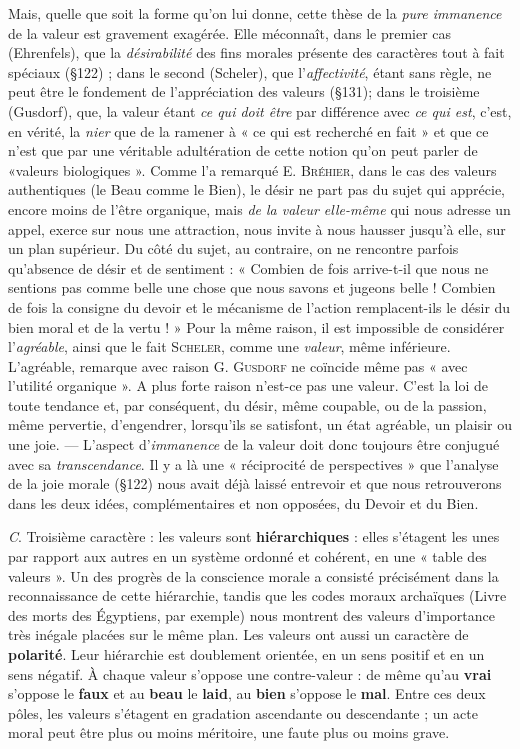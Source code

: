 Mais, quelle que soit la forme qu’on lui donne, cette thèse de la
{\it pure immanence} de la valeur est gravement exagérée. Elle méconnaît,
dans le premier cas (Ehrenfels), que la {\it désirabilité} des fins morales
présente des caractères tout à fait spéciaux (\S 122) ; dans le second
(Scheler), que l’{\it affectivité}, étant sans règle, ne peut être le fondement
de l'appréciation des valeurs (\S 131); dans le troisième (Gusdorf),
que, la valeur étant {\it ce qui doit être} par différence avec {\it ce qui est}, c’est,
en vérité, la {\it nier} que de la ramener à « ce qui est recherché en fait »
et que ce n’est que par une véritable adultération de cette notion
qu’on peut parler de «valeurs biologiques ». Comme l’a remarqué
E. \textsc{Bréhier}, dans le cas des valeurs authentiques (le Beau comme
le Bien), le désir ne part pas du sujet qui apprécie, encore moins
de l’être organique, mais {\it de la valeur elle-même} qui nous adresse
un appel, exerce sur nous une attraction, nous invite à nous hausser
jusqu’à elle, sur un plan supérieur. Du côté du sujet, au contraire,
on ne rencontre parfois qu’absence de désir et de sentiment : « Combien
de fois arrive-t-il que nous ne sentions pas comme belle une
chose que nous savons et jugeons belle ! Combien de fois la consigne du
devoir et le mécanisme de l’action remplacent-ils le désir du bien
moral et de la vertu ! » Pour la même raison, il est impossible de
considérer l’{\it agréable}, ainsi que le fait \textsc{Scheler}, comme une {\it valeur},
même inférieure. L’agréable, remarque avec raison G. \textsc{Gusdorf} ne
coïncide même pas « avec l'utilité organique ». A plus forte raison
n'est-ce pas une valeur. C’est la loi de toute tendance et, par conséquent,
du désir, même coupable, ou de la passion, même pervertie,
d’engendrer, lorsqu'ils se satisfont, un état agréable, un plaisir ou
une joie. — L'aspect d’{\it immanence} de la valeur doit donc toujours être
conjugué avec sa {\it transcendance}. Il y a là une « réciprocité de perspectives »
que l’analyse de la joie morale (\S 122) nous avait déjà
laissé entrevoir et que nous retrouverons dans les deux idées, complémentaires
et non opposées, du Devoir et du Bien.

{\it C}. Troisième caractère : les valeurs sont {\bf hiérarchiques} : elles
s’étagent les unes par rapport aux autres en un système ordonné et
cohérent, en une « table des valeurs ». Un des progrès de la conscience
morale a consisté précisément dans la reconnaissance de cette
hiérarchie, tandis que les codes moraux archaïques (Livre des morts des
Égyptiens, par exemple) nous montrent des valeurs d'importance
très inégale placées sur le même plan. Les valeurs ont aussi un caractère
de {\bf polarité}. Leur hiérarchie est doublement orientée, en un sens
positif et en un sens négatif. À chaque valeur s'oppose une
contre-valeur : de même qu’au {\bf vrai} s'oppose le {\bf faux} et au {\bf beau} le {\bf laid}, au {\bf bien}
s’oppose le {\bf mal}. Entre ces deux pôles, les valeurs s’étagent en
gradation ascendante ou descendante ; un acte moral peut être plus
ou moins méritoire, une faute plus ou moins grave.

